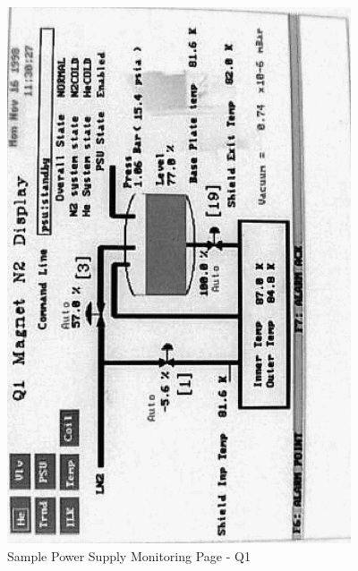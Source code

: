 \begin{center}
\begin{figure}
\includegraphics[angle=-90,width=4in]{spectrometers/Q1-n2.ps}
\caption{Sample Power Supply Monitoring Page - Q1\label{fig:ps_page}}
\end{figure}


\end{center}
